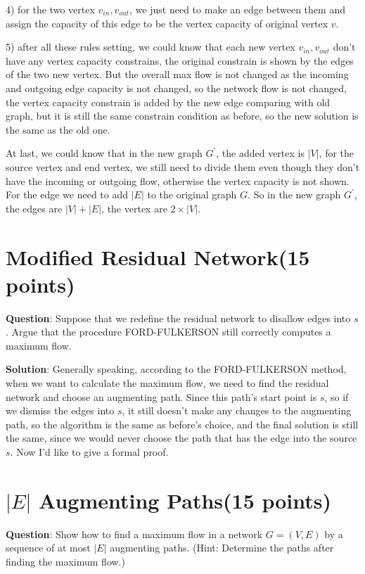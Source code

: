 \documentclass{article}
\begin{document}
4) for the two vertex $v_{in}, v_{out}$, we just need to make an edge between them and assign the capacity of this
edge to be the vertex capacity of original vertex $v$.

5) after all these rules setting, we could know that each new vertex $v_{in}, v_{out}$ don't have any vertex 
capacity constrains, the original constrain is shown by the edges of the two new vertex. But the overall max
flow is not changed as the incoming and outgoing edge capacity is not changed, so the network flow is not changed,
the vertex capacity constrain is added by the new edge comparing with old graph, but it is still the same constrain
condition as before, so the new solution is the same as the old one.

At last, we could know that in the new graph $G^{'}$, the added vertex is $|V|$, for the source vertex and end vertex,
we still need to divide them even though they don't have the incoming or outgoing flow, otherwise the vertex capacity
is not shown. For the edge we need to add $|E|$ to the original graph $G$. So in the new graph $G^{'}$, the edges are \boldmath\underline{$|V|+|E|$}\unboldmath, the vertex are \boldmath\underline{$2\times|V|$}\unboldmath.


\section{Modified Residual Network(15 points)}
\textbf{Question}: Suppose that we redefine the residual network to disallow edges into $s$. Argue that the procedure FORD-FULKERSON still correctly computes a maximum flow.\newline

\textbf{Solution}: Generally speaking, according to the FORD-FULKERSON method, when we want to calculate the maximum flow, we need to find the residual network and choose an augmenting path. Since this path's start point is $s$, so if we dismiss the edges into $s$, it still doesn't make any changes to the augmenting path, so the algorithm is the same as before's choice, and the final solution is still the same, since we would never choose the path that has the edge into the source $s$. Now I'd like to give a formal proof.





\section{$|E|$  Augmenting Paths(15 points)}
\textbf{Question}: Show how to find a maximum flow in a network $G = (V, E)$ by a sequence of at most $|E|$ augmenting paths. (Hint: Determine the paths after finding the maximum flow.)\newline
\end{document}

